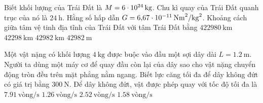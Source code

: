 \begin{ex}
Biết khối lượng của Trái Đất là $M = \SI{6E24}{\kilogram}$. Chu kì quay của Trái Đất quanh trục của nó là $\SI{24}{\hour}$. Hằng số hấp dẫn $G=\SI{6.67E-11}{\newton\meter^2/\kilogram^2}$. Khoảng cách giữa tâm vệ tinh địa tĩnh của Trái Đất với tâm Trái Đất bằng	
	\choice
	{$\SI{422980}{\kilo\meter}$}
	{\True $\SI{42298}{\kilo\meter}$}
	{$\SI{42982}{\kilo\meter}$}
	{$\SI{42982}{\meter}$}
\end{ex}
\begin{ex}
	Một vật nặng có khối lượng $\SI{4}{\kilogram}$ được buộc vào đầu một sợi dây dài $L=\SI{1.2}{\meter}$. Người ta dùng một máy cơ để quay đầu còn lại của dây sao cho vật nặng chuyển động tròn đều trên mặt phẳng nằm ngang. Biết lực căng tối đa để dây không đứt có giá trị bằng $\SI{300}{\newton}$. Để dây không đứt, vật được phép quay với tốc độ tối đa là
	\choice
	{$\SI{7.91}{\text{vòng}/\second}$}
	{\True $\SI{1.26}{\text{vòng}/\second}$}
	{$\SI{2.52}{\text{vòng}/\second}$}
	{$\SI{1.58}{\text{vòng}/\second}$}
\end{ex}

